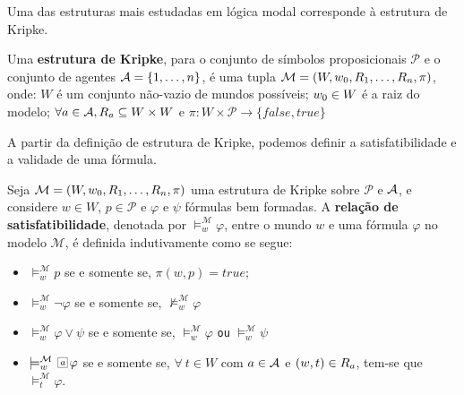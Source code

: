 Uma das estruturas mais estudadas em lógica modal corresponde à estrutura de
Kripke. 

\begin{definition}
    Uma \textbf{estrutura de Kripke}, para o conjunto de símbolos proposicionais
    $\mathcal{P}$ e o conjunto de agentes ${\cal{A}} = \{1,\ldots, n\}$, é
    uma tupla $\mathcal{M} = (W, w_0, R_1,\ldots, R_n, \pi)$, onde:
   $W$ é um conjunto não-vazio de mundos possíveis; $w_0 \in W$ é a raiz do modelo; 
   $\forall a \in {\cal{A}}, R_{a} \subseteq W \times W$ e
   $\pi : W \times \mathcal{P} \longrightarrow \{false, true\}$
    
\end{definition}

A partir da definição de estrutura de Kripke, podemos definir a satisfatibilidade
e a validade de uma fórmula.
\begin{definition}
    Seja $\mathcal{M} = (W, w_0, R_1, \ldots, R_n, \pi)$ uma estrutura de Kripke sobre
    $\mathcal{P}$ e ${\cal{A}}$, e considere $w \in W$, $p \in \mathcal{P}$
    e $\varphi$ e $\psi$ fórmulas bem formadas. A \textbf{relação de
    satisfatibilidade}, denotada por $\models ^{\mathcal{M}}_{w} \varphi$, entre
    o mundo $w$ e uma fórmula $\varphi$ no modelo $\mathcal{M}$, é definida
    indutivamente como se segue:
    \begin{itemize}
        \item $\models ^{\mathcal{M}}_{w} p$ se e somente se, $\pi(w,p) =
            true$;
        \item $\models ^{\mathcal{M}}_{w} \neg \varphi$ se e somente se,
            $\not\models ^{\mathcal{M}}_{w} \varphi$
            
        \item $\models ^{\mathcal{M}}_{w} \varphi \vee \psi$ se e somente se,
            $\models ^{\mathcal{M}}_{w} \varphi$ \texttt{ou} $\models
            ^{\mathcal{M}}_{w} \psi$
        \item $\models ^{\mathcal{M}}_{w} \nec{\agent} \varphi$ se e somente se,
            $\forall~t \in W$ com $a \in {\cal{A}}$  e $(w,t) \in R_{a}$,
            tem-se que $\models ^{\mathcal{M}}_{t} \varphi$. 
    \end{itemize}
\end{definition}

